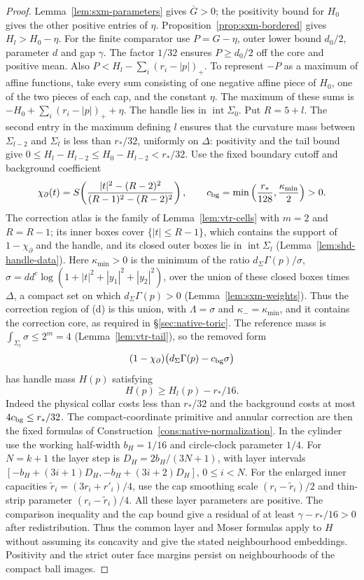\begin{proof}
Lemma~\ref{lem:sxm-parameters} gives $\overline G>0$; the positivity bound for $H_0$
gives the other positive entries of $\eta$.
Proposition~\ref{prop:sxm-bordered} gives $H_l>H_0-\eta$.
For the finite comparator use $P=G-\eta$, outer lower bound $d_0/2$, parameter $d$ and gap $\gamma$.
The factor $1/32$ ensures $P\ge d_0/2$ off the core and positive mean.
Also $P<H_l-\sum_i(r_i-|p|)_+$.
To represent $-P$ as a maximum of affine functions, take every sum consisting
of one negative affine piece of $H_0$, one of the two pieces of each cap, and
the constant $\eta$. The maximum of these sums is
$-H_0+\sum_i(r_i-|p|)_++\eta$.
The handle lies in $\operatorname{int}\Sigma_0$.
Put $R=5+l$. The second entry in the maximum defining $l$ ensures that the curvature mass between $\Sigma_{l-2}$ and $\Sigma_l$ is less than $r_*/32$,
uniformly on $\Delta$: positivity and the tail bound give
$0\le H_l-H_{l-2}\le H_0-H_{l-2}<r_*/32$.
Use the fixed boundary cutoff and background coefficient
\[
 \chi_\partial(t)=S\!\left(\frac{|t|^2-(R-2)^2}{(R-1)^2-(R-2)^2}\right),\qquad
 c_{\rm bg}=\min\left(\frac{r_*}{128},\frac{\kappa_{\min}}2\right)>0.
\]
The correction atlas is the family of Lemma~\ref{lem:vtr-cells} with $m=2$ and $R=R-1$; its inner boxes cover
$\{|t|\le R-1\}$, which contains the support of $1-\chi_\partial$ and the handle, and its closed outer boxes lie in
$\operatorname{int}\Sigma_l$ (Lemma~\ref{lem:shd-handle-data}). Here $\kappa_{\min}>0$ is the minimum of the ratio
$d_\Sigma\Gamma(p)/\sigma$, $\sigma=dd^c\log(1+|t|^2+|y_1|^2+|y_2|^2)$, over the union of these closed boxes times $\Delta$, a
compact set on which $d_\Sigma\Gamma(p)>0$ (Lemma~\ref{lem:sxm-weights}). Thus the correction region of
(d) is this union, with $\Lambda=\sigma$ and $\kappa_-=\kappa_{\min}$, and it contains the
correction core, as required in \S\ref{sec:native-toric}.
The reference mass is $\int_{\Sigma_l}\sigma\le2^m=4$ (Lemma~\ref{lem:vtr-tail}), so the removed form
\[
 (1-\chi_\partial)\bigl(d_\Sigma\Gamma(p)-c_{\rm bg}\sigma\bigr)
\]
has handle mass $H(p)$ satisfying
\[
 H(p)\ge H_l(p)-r_*/16.
\]
Indeed the physical collar costs less than $r_*/32$ and the background costs at most
$4c_{\rm bg}\le r_*/32$. The compact-coordinate primitive and annular correction are then the fixed formulas
of Construction~\ref{cons:native-normalization}. In the cylinder use the working half-width $b_H=1/16$ and circle-clock parameter $1/4$.
For $N=k+1$ the layer step is $D_H=2b_H/(3N+1)$, with layer intervals
$[-b_H+(3i+1)D_H,-b_H+(3i+2)D_H]$, $0\le i<N$.
For the enlarged inner capacities $\widetilde r_i=(3r_i+r'_i)/4$, use the cap smoothing scale
$(r_i-\widetilde r_i)/2$ and thin-strip parameter $(r_i-\widetilde r_i)/4$.
All these layer parameters are positive.
The comparison inequality and the cap bound give a residual of at least
$\gamma-r_*/16>0$ after redistribution. Thus the common layer and Moser formulas apply to $H$
without assuming its concavity and give the stated neighbourhood embeddings.
Positivity and the strict outer face margins persist on neighbourhoods of the compact ball images.
\end{proof}

